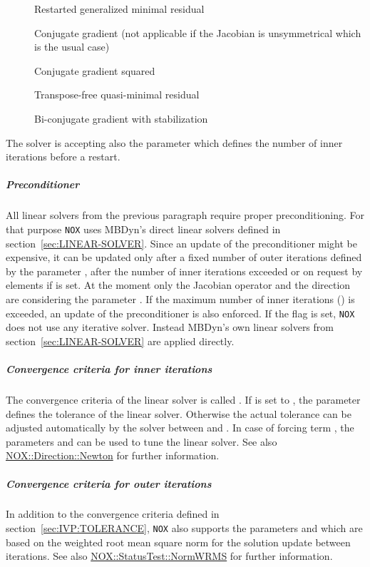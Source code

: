 \begin{description}
\item[] Restarted generalized minimal residual
\item[] Conjugate gradient (not applicable if the Jacobian is unsymmetrical which is the usual case)
\item[] Conjugate gradient squared
\item[] Transpose-free quasi-minimal residual
\item[] Bi-conjugate gradient with stabilization
\end{description}
The  solver is accepting also the parameter  which defines the number of inner iterations before a restart.
\subparagraph{Preconditioner}
All linear solvers from the previous paragraph require proper preconditioning. For that purpose \verb;NOX; uses MBDyn's direct linear solvers defined in section~\ref{sec:LINEAR-SOLVER}. Since an update of the preconditioner might be expensive, it can be updated only after a fixed number of outer iterations defined by the parameter , after the number of inner iterations exceeded  or on request by elements if  is set. At the moment only the  Jacobian operator and the  direction are considering the parameter . If the maximum number of inner iterations () is exceeded, an update of the preconditioner is also enforced. If the flag  is set, \verb;NOX; does not use any iterative solver. Instead MBDyn's own linear solvers from section~\ref{sec:LINEAR-SOLVER} are applied directly.
\subparagraph{Convergence criteria for inner iterations}
The convergence criteria of the linear solver is called . If  is set to , the parameter  defines the tolerance of the linear solver. Otherwise the actual tolerance can be adjusted automatically by the solver between  and . In case of forcing term , the parameters  and  can be used to tune the linear solver. See also \href{https://docs.trilinos.org/latest-release/packages/nox/doc/html/classNOX_1_1Direction_1_1Newton.html}{NOX::Direction::Newton} for further information.
\subparagraph{Convergence criteria for outer iterations}
In addition to the convergence criteria defined in section~\ref{sec:IVP:TOLERANCE}, \verb;NOX; also supports the parameters  and  which are based on the weighted root mean square norm for the solution update between iterations. See also \href{https://docs.trilinos.org/latest-release/packages/nox/doc/html/classNOX_1_1StatusTest_1_1NormWRMS.html}{NOX::StatusTest::NormWRMS} for further information.
